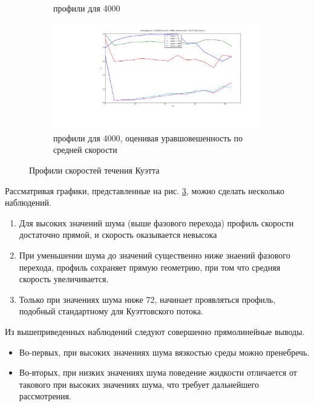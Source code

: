 \begin{figure}
\begin{subfigure}{0.45\textwidth}
                \caption{профили для 4000}
                \label{fig:Results:4kNew}
        \end{subfigure}
        \begin{subfigure}{0.45\textwidth}
                \includegraphics[width=\textwidth]{Images/4k_slices_oldAlg}
                \caption{профили для 4000, оценивая уравшовешенность по средней скорости}
                \label{fig:Results:4kOld}
        \end{subfigure}
        \caption{Профили скоростей течения Куэтта}
        \label{fig:Results}
        \end{figure}

        Рассматривая графики, представленные на рис. \ref{fig:Results}, можно сделать несколько наблюдений.
        \begin{enumerate}
            \item Для высоких значений шума (выше фазового перехода) профиль скорости достаточно прямой, и скорость оказывается невысока
            \item При уменьшении шума до значений существенно ниже знаений фазового перехода, профиль сохраняет прямую геометрию, при том что средняя скорость увеличивается.
            \item Только при значениях шума ниже 72, начинает проявляться профиль, подобный стандартному для Куэттовского потока.
        \end{enumerate}

        Из вышеприведенных наблюдений следуют совершенно прямолинейные выводы.



        \begin{itemize}
            \item Во-первых, при высоких значениях шума вязкостью среды можно пренебречь.
            \item Во-вторых, при низких значениях шума поведение жидкости отличается от такового при высоких значениях шума, что требует дальнейшего рассмотрения. 
        \end{itemize}

